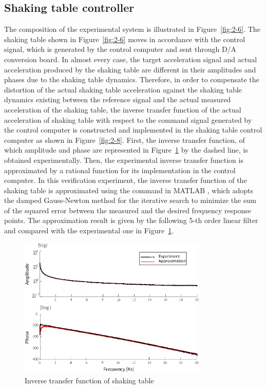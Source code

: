 \subsection{Shaking table controller}
The composition of the experimental system is illustrated in Figure~\ref{fig:2-6}. The shaking table shown in Figure~\ref{fig:2-6} moves in accordance with the control signal, which is generated by the control computer and sent through D/A conversion board. In almost every case, the target acceleration signal and actual acceleration produced by the shaking table are different in their amplitudes and phases due to the shaking table dynamics. Therefore, in order to compensate the distortion of the actual shaking table acceleration against the shaking table dynamics existing between the reference signal and the actual measured acceleration of the shaking table, the inverse transfer function of the actual acceleration of shaking table with respect to the command signal generated by the control computer is constructed and implemented in the shaking table control computer as shown in Figure~\ref{fig:2-8}. First, the inverse transfer function, of which amplitude and phase are represented in Figure~\ref{fig:2-7} by the dashed line, is obtained experimentally. Then, the experimental inverse transfer function is approximated by a rational function for its implementation in the control computer. In this verification experiment, the inverse transfer function of the shaking table is approximated using the command  in MATLAB \citep{little1992signal}, which adopts the damped Gauss-Newton method for the iterative search to minimize the sum of the squared error between the measured and the desired frequency response points\citep{dennis1983numerical}. The approximation result is given by the following 5-th order linear filter and compared with the experimental one in Figure~\ref{fig:2-7}. 

\begin{figure}[ht]
\centering
\includegraphics[width=0.8\textwidth] {figure/2-7.eps}
\caption{Inverse transfer function of shaking table}
\label{fig:2-7}
\end{figure}

